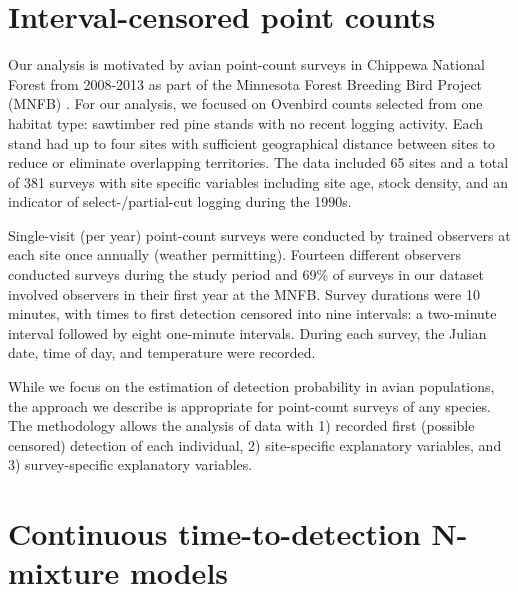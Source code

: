 \documentclass[12pt]{article}
\begin{document}
\section{Interval-censored point counts}\label{sec:data}

Our analysis is motivated by avian point-count surveys in Chippewa National Forest from 2008-2013 as part of the Minnesota Forest Breeding Bird Project (MNFB) \citep{Hanowski1995}.  
For our analysis, we focused on Ovenbird counts selected from one habitat type: sawtimber red pine stands with no recent logging activity.  
Each stand had up to four sites with sufficient geographical distance between sites to reduce or eliminate overlapping territories.
The data included 65 sites and a total of 381 surveys with site specific variables including site age,  stock density, and an indicator of select-/partial-cut logging during the 1990s. 

Single-visit (per year) point-count surveys were conducted by trained observers at each site once annually (weather permitting).  
Fourteen different observers conducted surveys during the study period and 69\% of surveys in our dataset involved observers in their first year at the MNFB.  
Survey durations were 10 minutes, with times to first detection censored into nine intervals: a two-minute interval followed by eight one-minute intervals.  
During each survey, the Julian date, time of day, and temperature were recorded. 


While we focus on the estimation of detection probability in avian populations, the approach we describe is appropriate for point-count surveys of any species.
The methodology allows the analysis of data with 1) recorded first (possible censored) detection of each individual, 2) site-specific explanatory variables, and 3) survey-specific explanatory variables.  






\section{Continuous time-to-detection N-mixture models} \label{sec:model}
\end{document}
